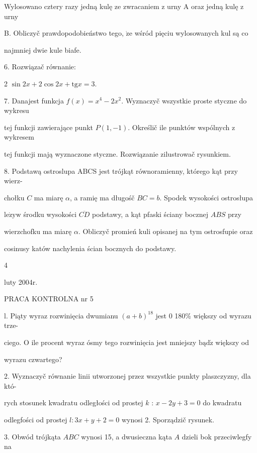 \documentclass[a4paper,12pt]{article}
\begin{document}
Wylosowano cztery razy jedną kulę ze zwracaniem $\mathrm{z}$ urny A oraz jedną kulę $\mathrm{z}$ urny

B. Obliczyč prawdopodobieństwo tego, $\dot{\mathrm{z}}\mathrm{e}$ wśród pięciu wylosowanych kul są co

najmniej dwie kule biafe.

6. Rozwiązač równanie:

2 $\sin 2x+2\cos 2x+\mathrm{t}\mathrm{g}x=3.$

7. Danajest funkcja $f(x)=x^{4}-2x^{2}$. Wyznaczyč wszystkie proste styczne do wykresu

tej funkcji zawierające punkt $P(1,-1)$. Określič ile punktów wspólnych $\mathrm{z}$ wykresem

tej funkcji mają wyznaczone styczne. Rozwiązanie zilustrowač rysunkiem.

8. Podstawą ostroslupa ABCS jest trójkąt równoramienny, którego kąt przy wierz-

chołku $C$ ma miarę $\alpha$, a ramię ma długośč $BC=b$. Spodek wysokości ostrosłupa

$\mathrm{l}\mathrm{e}\dot{\mathrm{z}}\mathrm{y}\mathrm{w}$ środku wysokości $\overline{CD}$ podstawy, a kąt pfaski ściany bocznej $ABS$ przy

wierzchofku ma miarę $\alpha$. Obliczyč promień kuli opisanej na tym ostrosfupie oraz

cosinusy katów nachylenia ścian bocznych do podstawy.

4





luty 2004r.

PRACA KONTROLNA nr 5

l. Piąty wyraz rozwinięcia dwumianu $(a+b)^{18}$ jest $0$ 180\% większy od wyrazu trze-

ciego. $\mathrm{O}$ ile procent wyraz ósmy tego rozwinięcia jest mniejszy $\mathrm{b}\text{ą} \mathrm{d}\acute{\mathrm{z}}$ większy od

wyrazu czwartego?

2. Wyznaczyč równanie linii utworzonej przez wszystkie punkty plaszczyzny, dla któ-

rych stosunek kwadratu odległości od prostej $k$ : $x-2y+3 = 0$ do kwadratu

odlegfości od prostej $l:3x+y+2=0$ wynosi 2. Sporządzič rysunek.

3. Obwód trójkąta $ABC$ wynosi 15, a dwusieczna kąta $A$ dzieli bok przeciwlegfy na
\end{document}
